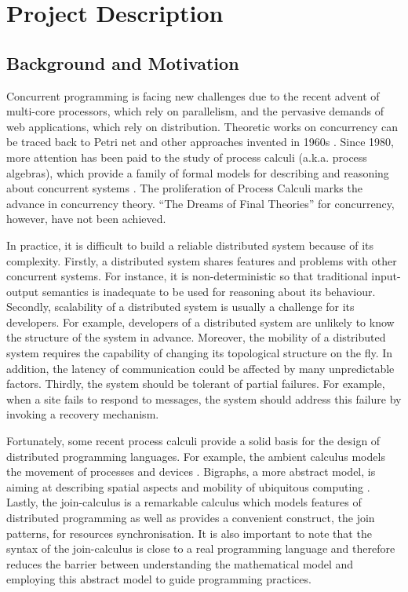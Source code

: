 \section{Project Description}

\subsection{Background and Motivation}

Concurrent programming is facing new challenges due to the recent advent of multi-core processors, which rely on parallelism, and the pervasive demands of web applications, which rely on distribution.  Theoretic works on concurrency can be traced back to Petri net and other approaches invented in 1960s \cite{historyPA}.  Since 1980, more attention has been paid to the study of process calculi (a.k.a. process algebras), which provide a family of formal models for describing and reasoning about concurrent systems \cite{abramsky}.  The proliferation of Process Calculi marks the advance in concurrency theory.  ``The Dreams of Final Theories'' \cite{abramsky} for concurrency, however, have not been achieved.

In practice, it is difficult to build a reliable distributed system because of its complexity.  Firstly, a distributed system shares features and problems with other concurrent systems.  For instance, it is non-deterministic so that traditional input-output semantics is inadequate to be used for reasoning about its behaviour.  Secondly, scalability of a distributed system is usually a challenge for its developers.  For example, developers of a distributed system are unlikely to know the structure of the system in advance.  Moreover, the mobility \cite{MobileAmbients} of a distributed system requires the capability of changing its topological structure on the fly.  In addition, the latency of communication could be affected by many unpredictable factors.  Thirdly, the system should be tolerant of partial failures.  For example, when a site fails to respond to messages,  the system should address this failure by invoking a recovery mechanism.   	

Fortunately, some recent process calculi provide a solid basis for the design of distributed programming languages.  For example, the ambient calculus models the movement of processes and devices \cite{MobileAmbients}.  Bigraphs, a more abstract model, is aiming at describing spatial aspects and mobility of ubiquitous computing \cite{bigraph_book}.  Lastly, the join-calculus \cite{full_join} is a remarkable calculus which models features of distributed programming as well as provides a convenient construct, the join patterns, for resources synchronisation.  It is also important to note that the syntax of the join-calculus is close to a real programming language and therefore reduces the barrier between understanding the mathematical model and employing this abstract model to guide programming practices.

